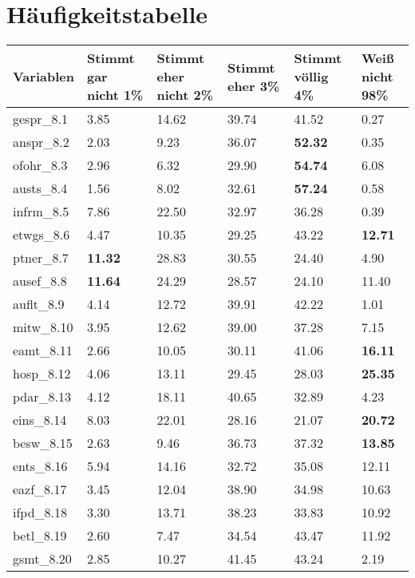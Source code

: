 \section{Häufigkeitstabelle}
\label{A}

\begin{table}[h]
\small

\begin{tabularx}{\textwidth}{XXXXXX}
\hline 
Variablen &
Stimmt gar nicht
1\% &
Stimmt eher nicht
2\% &
Stimmt eher
3\% &
Stimmt völlig
4\% &
Weiß nicht
98\% \\
\hline 
gespr\_8.1&
3.85&
14.62&
39.74&
41.52&
0.27\\
anspr\_8.2&
2.03&
9.23&
36.07&
\textbf{52.32}&
0.35\\
ofohr\_8.3&
2.96&
6.32&
29.90&
\textbf{54.74}&
6.08\\
austs\_8.4&
1.56&
8.02&
32.61&
\textbf{57.24}&
0.58\\
infrm\_8.5&
7.86&
22.50&
32.97&
36.28&
0.39\\
etwgs\_8.6&
4.47&
10.35&
29.25&
43.22&
\textbf{12.71}\\
ptner\_8.7&
\textbf{11.32}&
28.83&
30.55&
24.40&
4.90\\
ausef\_8.8&
\textbf{11.64}&
24.29&
28.57&
24.10&
11.40\\
auflt\_8.9&
4.14&
12.72&
39.91&
42.22&
1.01\\
mitw\_8.10&
3.95&
12.62&
39.00&
37.28&
7.15\\
eamt\_8.11&
2.66&
10.05&
30.11&
41.06&
\textbf{16.11}\\
hosp\_8.12&
4.06&
13.11&
29.45&
28.03&
\textbf{25.35}\\
pdar\_8.13&
4.12&
18.11&
40.65&
32.89&
4.23\\
eins\_8.14&
8.03&
22.01&
28.16&
21.07&
\textbf{20.72}\\
besw\_8.15&
2.63&
9.46&
36.73&
37.32&
\textbf{13.85}\\
ents\_8.16&
5.94&
14.16&
32.72&
35.08&
12.11\\
eazf\_8.17&
3.45&
12.04&
38.90&
34.98&
10.63\\
ifpd\_8.18&
3.30&
13.71&
38.23&
33.83&
10.92\\
betl\_8.19&
2.60&
7.47&
34.54&
43.47&
11.92\\
gsmt\_8.20&
2.85&
10.27&
41.45&
43.24&
2.19\\
\hline 
\end{tabularx} 
\end{table}